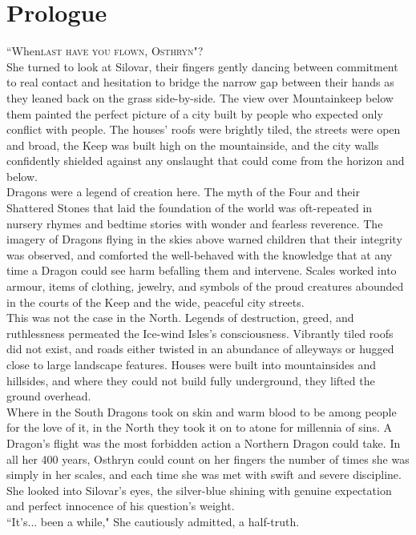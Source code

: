 \chapter{Prologue}

\lettrine{``When}{last have you flown, Osthryn"?}\\
She turned to look at Silovar, their fingers gently dancing between commitment to real contact and hesitation to bridge the narrow gap between their hands as they leaned back on the grass side-by-side.
The view over Mountainkeep below them painted the perfect picture of a city built by people who expected only conflict with people.
The houses' roofs were brightly tiled, the streets were open and broad, the Keep was built high on the mountainside, and the city walls confidently shielded against any onslaught that could come from the horizon and below.\\

Dragons were a legend of creation here.
The myth of the Four and their Shattered Stones that laid the foundation of the world was oft-repeated in nursery rhymes and bedtime stories with wonder and fearless reverence.
The imagery of Dragons flying in the skies above warned children that their integrity was observed, and comforted the well-behaved with the knowledge that at any time a Dragon could see harm befalling them and intervene.
Scales worked into armour, items of clothing, jewelry, and symbols of the proud creatures abounded in the courts of the Keep and the wide, peaceful city streets.\\

This was not the case in the North.
Legends of destruction, greed, and ruthlessness permeated the Ice-wind Isles's consciousness.
Vibrantly tiled roofs did not exist, and roads either twisted in an abundance of alleyways or hugged close to large landscape features.
Houses were built into mountainsides and hillsides, and where they could not build fully underground, they lifted the ground overhead.\\

Where in the South Dragons took on skin and warm blood to be among people for the love of it, in the North they took it on to atone for millennia of sins.
A Dragon's flight was the most forbidden action a Northern Dragon could take. 
In all her 400 years, Osthryn could count on her fingers the number of times she was simply in her scales, and each time she was met with swift and severe discipline.\\

She looked into Silovar's eyes, the silver-blue shining with genuine expectation and perfect innocence of his question's weight.\\

``It's... been a while," She cautiously admitted, a half-truth.\\


\cleardoublepage   %